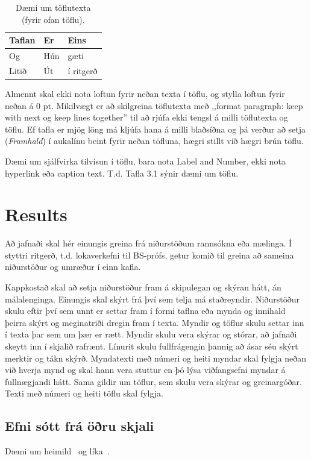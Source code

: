 \documentclass[a4paper, 12pt, twoside]{scrreprt}
\begin{document}
\begin{table}[htb]
\centering
\caption{Dæmi um töflutexta (fyrir ofan töflu).}
     \sffamily \begin{tabularx}{1.0\textwidth}{ p{5cm}  p{5cm}  p{5cm} }
    \hline
   \textbf{Taflan} \hfill & \textbf{Er} \hfill & \textbf{Eins} \\ \hline
    Og & Hún & gæti\\
    Litið & Út & í ritgerð\\ \hline
    \end{tabularx} \normalfont
\label{table:Emissivity}
\end{table}

Almennt skal ekki nota loftun fyrir neðan texta í töflu, og stylla loftun fyrir neðan á 0 pt.
Mikilvægt er að skilgreina töflutexta með ,,format paragraph: keep with next og keep lines together” til að rjúfa ekki tengsl á milli töflutexta og töflu. Ef tafla er mjög löng má kljúfa hana á milli blaðsíðna og þá verður að setja (\textit{Framhald}) í aukalínu beint fyrir neðan töfluna, hægri stillt við hægri brún töflu.

Dæmi um sjálfvirka tilvísun í töflu, bara nota Label and Number, ekki nota hyperlink eða caption text. T.d. Tafla 3.1 sýnir dæmi um töflu.

\chapter{Results}
Að jafnaði skal hér einungis greina frá niðurstöðum rannsókna eða mælinga. Í styttri ritgerð, t.d. lokaverkefni til BS-prófs, getur komið til greina að sameina niðurstöður og umræður í einn kafla.

Kappkostað skal að setja niðurstöður fram á skipulegan og skýran hátt, án málalenginga. Einungis skal skýrt frá því sem telja má staðreyndir. Niðurstöður skulu eftir því sem unnt er settar fram í formi taflna eða mynda og innihald þeirra skýrt og meginatriði dregin fram í texta. Myndir og töflur skulu settar inn í texta þar sem um þær er rætt. Myndir skulu vera skýrar og stórar, að jafnaði skeytt inn í skjalið rafrænt. Línurit skulu fullfrágengin þannig að ásar séu skýrt merktir og tákn skýrð. Myndatexti með númeri og heiti myndar skal fylgja neðan við hverja mynd og skal hann vera stuttur en þó lýsa viðfangsefni myndar á fullnægjandi hátt. Sama gildir um töflur, sem skulu vera skýrar og greinargóðar. Texti með númeri og heiti töflu skal fylgja.

\section{Efni sótt frá öðru skjali}
Dæmi um heimild~\cite{dirac} og líka~\cite{einstein}.

\end{document}
